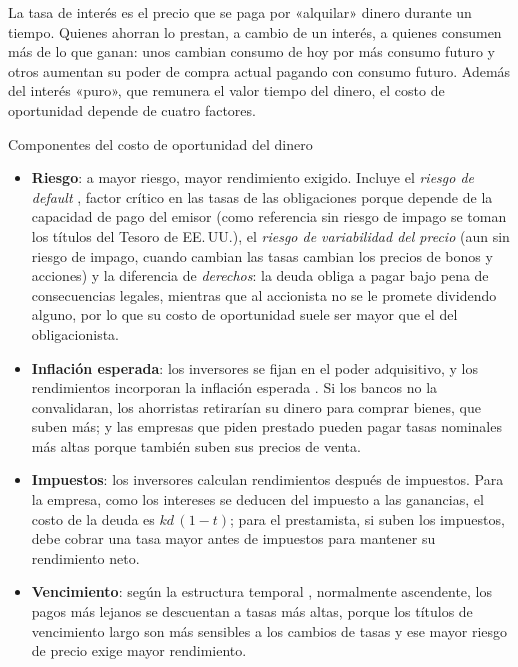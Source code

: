 La tasa de interés es el precio que se paga por «alquilar» dinero durante un tiempo. Quienes ahorran lo prestan, a cambio de un interés, a quienes consumen más de lo que ganan: unos cambian consumo de hoy por más consumo futuro y otros aumentan su poder de compra actual pagando con consumo futuro. Además del interés «puro», que remunera el valor tiempo del dinero, el costo de oportunidad depende de cuatro factores.

\begin{definicion}{Componentes del costo de oportunidad del dinero}
\begin{itemize}
\item \textbf{Riesgo}: a mayor riesgo, mayor rendimiento exigido. Incluye el \emph{riesgo de default} , factor crítico en las tasas de las obligaciones porque depende de la capacidad de pago del emisor (como referencia sin riesgo de impago se toman los títulos del Tesoro de EE.\,UU.), el \emph{riesgo de variabilidad del precio} (aun sin riesgo de impago, cuando cambian las tasas cambian los precios de bonos y acciones) y la diferencia de \emph{derechos}: la deuda obliga a pagar bajo pena de consecuencias legales, mientras que al accionista no se le promete dividendo alguno, por lo que su costo de oportunidad suele ser mayor que el del obligacionista.
\item \textbf{Inflación esperada}: los inversores se fijan en el poder adquisitivo, y los rendimientos incorporan la inflación esperada . Si los bancos no la convalidaran, los ahorristas retirarían su dinero para comprar bienes, que suben más; y las empresas que piden prestado pueden pagar tasas nominales más altas porque también suben sus precios de venta.
\item \textbf{Impuestos}: los inversores calculan rendimientos después de impuestos. Para la empresa, como los intereses se deducen del impuesto a las ganancias, el costo de la deuda es $kd\,(1-t)$; para el prestamista, si suben los impuestos, debe cobrar una tasa mayor antes de impuestos para mantener su rendimiento neto.
\item \textbf{Vencimiento}: según la estructura temporal , normalmente ascendente, los pagos más lejanos se descuentan a tasas más altas, porque los títulos de vencimiento largo son más sensibles a los cambios de tasas y ese mayor riesgo de precio exige mayor rendimiento.
\end{itemize}
\end{definicion}

